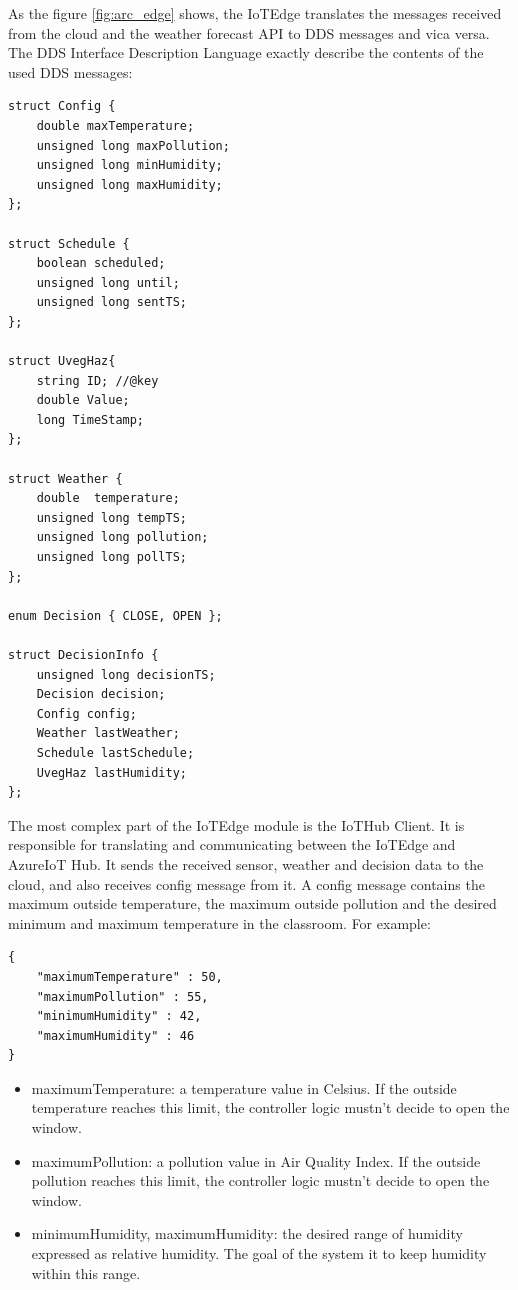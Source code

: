 \documentclass{article}
\begin{document}
As the figure \ref{fig:arc_edge} shows, the IoTEdge translates the messages received from the cloud and the weather forecast API to DDS messages and vica versa. The DDS Interface Description Language exactly describe the contents of the used DDS messages:
\begin{verbatim}
struct Config {
    double maxTemperature;
    unsigned long maxPollution;
    unsigned long minHumidity;
    unsigned long maxHumidity;
};

struct Schedule {
    boolean scheduled;
    unsigned long until;
    unsigned long sentTS;
};

struct UvegHaz{
    string ID; //@key
    double Value;
    long TimeStamp;
};

struct Weather {
    double  temperature;
    unsigned long tempTS;
    unsigned long pollution;
    unsigned long pollTS;
};

enum Decision { CLOSE, OPEN };

struct DecisionInfo {
    unsigned long decisionTS;
    Decision decision;
    Config config;
    Weather lastWeather;
    Schedule lastSchedule;
    UvegHaz lastHumidity;
};
\end{verbatim}
The most complex part of the IoTEdge module is the IoTHub Client. It is responsible for translating and communicating between the IoTEdge and AzureIoT Hub. It sends the received sensor, weather and decision data to the cloud, and also receives config message from it. A config message contains the maximum outside temperature, the maximum outside pollution and the desired minimum and maximum temperature in the classroom. For example:
\begin{verbatim}
{
    "maximumTemperature" : 50,
    "maximumPollution" : 55,
    "minimumHumidity" : 42,
    "maximumHumidity" : 46
}
\end{verbatim}
\begin{itemize}
\item maximumTemperature: a temperature value in Celsius. If the outside temperature reaches this limit, the controller logic mustn't decide to open the window.
\item maximumPollution:  a pollution value in Air Quality Index. If the outside pollution reaches this limit, the controller logic mustn't decide to open the window.
\item minimumHumidity, maximumHumidity: the desired range of humidity expressed as relative humidity. The goal of the system it to keep humidity within this range.
\end{itemize}
\end{document}
